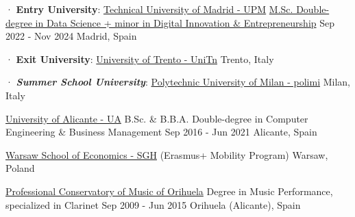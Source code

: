 

\begin{cventries}

  \cventry
    {· \textbf{Entry University}: \href{https://www.upm.es/}{Technical University of Madrid - UPM}} %
    {\href{https://masterschool.eitdigital.eu/data-science}{M.Sc. Double-degree in Data Science + minor in Digital Innovation \& Entrepreneurship}} %
    {Sep 2022 - Nov 2024} %
    {Madrid, Spain} %
    {}
    
  \cventrynew
	{· \textbf{Exit University}: \href{https://www.unitn.it/en}{University of Trento - UniTn}} %
	{} %
	{} %
	{Trento, Italy} %
	{}

  \cventrynewnew
	{· \textit{\textbf{Summer School University}}: \href{https://www.polimi.it/}{Polytechnic University of Milan - polimi}} %
	{} %
	{} %
	{Milan, Italy} %
	{}
	
  \cventrymod
	{\href{https://www.ua.es/}{University of Alicante - UA}} %
	{B.Sc. \&  B.B.A. Double-degree in Computer Engineering \& Business Management} %
	{Sep 2016 - Jun 2021} %
	{Alicante, Spain} %
	{}
	
  \cventrynew
	{\href{https://www.sgh.waw.pl/en}{Warsaw School of Economics - SGH}  (Erasmus+ Mobility Program)} %
	{} %
	{} %
	{Warsaw, Poland} %
	{}
	
  \cventrymod
	{\href{https://conservatorioorihuela.com/}{Professional Conservatory of Music of Orihuela}} %
	{Degree in Music Performance, specialized in Clarinet} %
	{Sep 2009 - Jun 2015} %
	{Orihuela (Alicante), Spain} %
	{}
		
\end{cventries}
